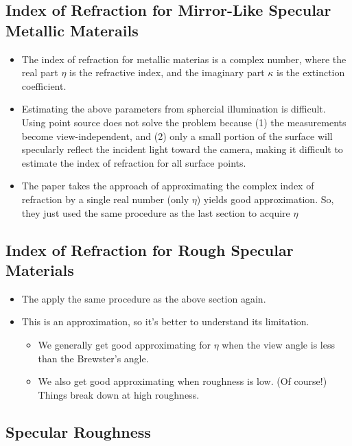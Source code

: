 \documentclass[10pt]{article}
\begin{document}
    \subsection{Index of Refraction for Mirror-Like Specular Metallic Materails}

    \begin{itemize}
      \item The index of refraction for metallic materias is a complex number, where the real part $\eta$ is the refractive index, and the imaginary part $\kappa$ is the extinction coefficient.

      \item Estimating the above parameters from sphercial illumination is difficult.  Using point source does not solve the problem because (1) the measurements become view-independent, and (2) only a small portion of the surface will specularly reflect the incident light toward the camera, making it difficult to estimate the index of refraction for all surface points.

      \item The paper takes the approach of approximating the complex index of refraction by a single real number (only $\eta$) yields good approximation.  So, they just used the same procedure as the last section to acquire $\eta$
    \end{itemize}

    \subsection{Index of Refraction for Rough Specular Materials}

    \begin{itemize}
      \item The apply the same procedure as the above section again.

      \item This is an approximation, so it's better to understand its limitation.
      \begin{itemize}
        \item We generally get good approximating for $\eta$ when the view angle is less than the Brewster's angle.
        \item We also get good approximating when roughness is low.  (Of course!)  Things break down at high roughness.
      \end{itemize}
    \end{itemize}

    \subsection{Specular Roughness}
\end{document}
